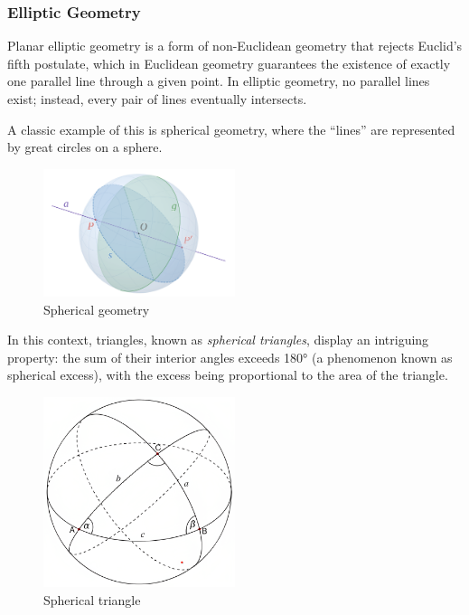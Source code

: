 \subsubsection{Elliptic Geometry}

Planar elliptic geometry is a form of non-Euclidean geometry that rejects Euclid’s fifth postulate, which in Euclidean geometry guarantees the existence of exactly one parallel line through a given point. In elliptic geometry, no parallel lines exist; instead, every pair of lines eventually intersects.

A classic example of this is spherical geometry, where the “lines” are represented by great circles on a sphere.

\begin{figure}[H]
    \centering
    \includegraphics[width=0.5\textwidth]{assets/spherical_geometry.png}
    \caption{Spherical geometry}
\end{figure}

In this context, triangles, known as \textit{spherical triangles}, display an intriguing property: the sum of their interior angles exceeds 180° (a phenomenon known as spherical excess), with the excess being proportional to the area of the triangle.

\begin{figure}[H]
    \centering
    \includegraphics[width=0.5\textwidth]{assets/spherical_triangle.png}
    \caption{Spherical triangle}
\end{figure}

